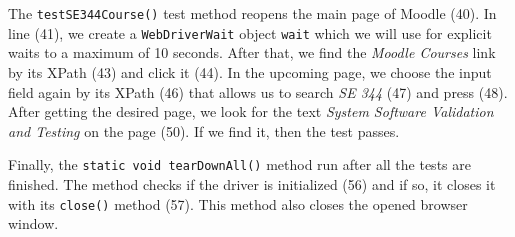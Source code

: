 The \lstinline!testSE344Course()! test method reopens the main page of Moodle (40). In line (41), we create a \lstinline!WebDriverWait! object \lstinline!wait! which we will use for explicit waits to a maximum of 10 seconds. After that, we find the \emph{Moodle Courses} link by its XPath (43) and click it (44). In the upcoming page, we choose the input field again by its XPath (46) that allows us to search \emph{SE 344} (47) and press \keys{\return} (48). After getting the desired page, we look for the text \emph{System Software Validation and Testing} on the page (50). If we find it, then the test passes.

Finally, the \lstinline!static void tearDownAll()! method run after all the tests are finished. The method checks if the driver is initialized (56) and if so, it closes it with its \lstinline!close()! method (57). This method also closes the opened browser window.
